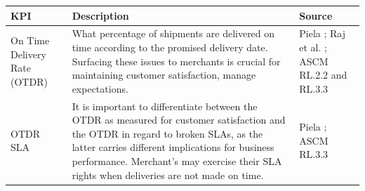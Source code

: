 \documentclass{imc-inf}
\begin{document}
\begin{table}[!htbp]
  \centering
  \small
  \begin{tabular}{@{}>{\raggedright\arraybackslash}p{4cm}p{8cm}>{\raggedright\arraybackslash}p{3cm}@{}}
    \toprule
    \textbf{KPI}                                                                                                                                                                                                                                                                                                                               & \textbf{Description} & \textbf{Source} \\
    \midrule
    On Time Delivery Rate (OTDR)                                                                                                                                                                                                                                                                                                               &
    What percentage of shipments are delivered on time according to the promised delivery date. Surfacing these issues to merchants is crucial for maintaining customer satisfaction, manage expectations.                                                                                                                                     &
    Piela \cite{pielaKeyPerformanceIndicator2017}; Raj et al. \cite{rajStochasticModelingIntegrated2024}; ASCM RL.2.2 and RL.3.3 \cite{ascm2022scor}                                                                                                                                                                                                                                    \\[6pt]

    OTDR SLA                                                                                                                                                                                                                                                                                                                                   &
    It is important to differentiate between the OTDR as measured for customer satisfaction and the OTDR in regard to broken SLAs, as the latter carries different implications for business performance. Merchant's may exercise their SLA rights when deliveries are not made on time.                                                       &
    Piela \cite{pielaKeyPerformanceIndicator2017}; ASCM RL.3.3 \cite{ascm2022scor}                                                                                                                                                                                                                                                                                                      \\[6pt]


\end{tabular}
\end{table}
\end{document}

